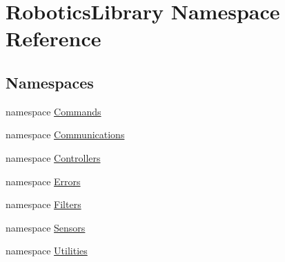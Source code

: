 \hypertarget{namespace_robotics_library}{}\section{Robotics\+Library Namespace Reference}
\label{namespace_robotics_library}
\subsection*{Namespaces}
\begin{DoxyCompactItemize}
\item 
namespace \hyperlink{namespace_robotics_library_1_1_commands}{Commands}
\item 
namespace \hyperlink{namespace_robotics_library_1_1_communications}{Communications}
\item 
namespace \hyperlink{namespace_robotics_library_1_1_controllers}{Controllers}
\item 
namespace \hyperlink{namespace_robotics_library_1_1_errors}{Errors}
\item 
namespace \hyperlink{namespace_robotics_library_1_1_filters}{Filters}
\item 
namespace \hyperlink{namespace_robotics_library_1_1_sensors}{Sensors}
\item 
namespace \hyperlink{namespace_robotics_library_1_1_utilities}{Utilities}
\end{DoxyCompactItemize}
